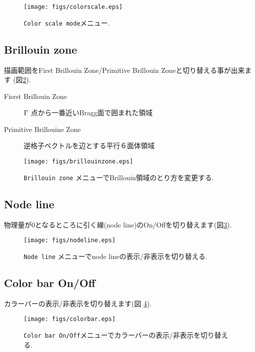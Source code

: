 \documentclass[12pt]{jarticle}
\begin{document}
\begin{figure}[!ht]
  \texttt{[image: figs/colorscale.eps]}
  \caption{\texttt{Color scale mode}メニュー.}
  \label{fig_colorscale}
\end{figure}

\subsection{Brillouin zone}

描画範囲をFirst Brillouin Zone/Primitive Brillouin Zoneと切り替える事が出来ます
(図\ref{fig_brillouinzone}).
\begin{description}
\item[Fisrst Brillouin Zone] ${\rm \Gamma}$ 点から一番近いBragg面で囲まれた領域
\item[Primitive Brillouine Zone] 逆格子ベクトルを辺とする平行６面体領域
\end{description}

\begin{figure}[!ht]
  \texttt{[image: figs/brillouinzone.eps]}
  \caption{\texttt{Brillouin zone} メニューでBrillouin領域のとり方を変更する.}
  \label{fig_brillouinzone}
\end{figure}

\subsection{Node line}

物理量が0となるところに引く線(node line)のOn/Offを切り替えます(図\ref{fig_nodeline}).

\begin{figure}[!ht]
  \texttt{[image: figs/nodeline.eps]}
  \caption{\texttt{Node line} メニューでnode lineの表示/非表示を切り替える.}
  \label{fig_nodeline}
\end{figure}

\subsection{Color bar On/Off}

カラーバーの表示/非表示を切り替えます(図 \ref{fig_colorbar}). 

\begin{figure}[!ht]
  \texttt{[image: figs/colorbar.eps]}
  \caption{\texttt{Color bar On/Off}メニューでカラーバーの表示/非表示を切り替える.}
  \label{fig_colorbar}
\end{figure}
\end{document}
